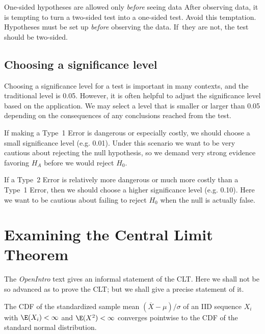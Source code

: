 \begin{caution}{One-sided hypotheses are allowed only \emph{before} seeing data}
{After observing data, it is tempting to turn a two-sided test into a one-sided test. Avoid this temptation. Hypotheses must be set up \emph{before} observing the data. If~they are not, the test should be two-sided.}
\end{caution}


\subsection{Choosing a significance level}
\label{significanceLevel}


Choosing a significance level for a test is important in many contexts, and the traditional level is 0.05. However, it is often helpful to adjust the significance level based on the application. We may select a level that is smaller or larger than 0.05 depending on the consequences of any conclusions reached from the test.

If making a Type~1 Error is dangerous or especially costly, we should choose a small significance level (e.g. 0.01). Under this scenario we want to be very cautious about rejecting the null hypothesis, so we demand very strong evidence favoring $H_A$ before we would reject $H_0$.

If a Type~2 Error is relatively more dangerous or much more costly than a Type~1 Error, then we should choose a higher significance level (e.g. 0.10). Here we want to be cautious about failing to reject $H_0$ when the null is actually false.






\section{Examining the Central Limit Theorem}
\label{cltSection}



The \emph{OpenIntro} text gives an informal statement of the CLT. Here we shall not be so advanced as to prove the CLT; but we shall give a precise statement of it.

The CDF of the standardized sample mean $(\overline X-\mu)/\sigma$ of an IID sequence $X_i$ with $\E(X_i)<\infty$ and $\E(X^2)<\infty$ converges pointwise to the CDF of the standard normal distribution.

